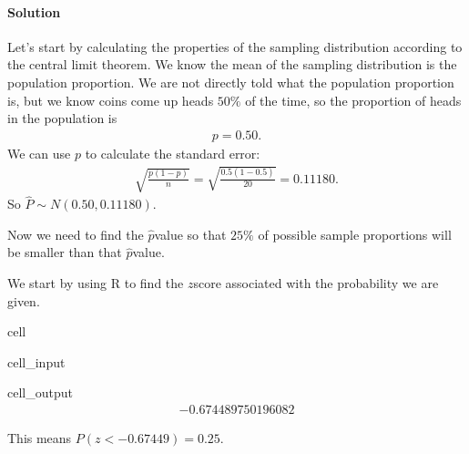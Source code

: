 \documentclass[letterpaper,10pt,english]{jupyterBook}
\begin{document}
\paragraph{Solution}
\label{\detokenize{Ch4 The Normal Distribution and the Central Limit Theorem/4.5 The Central Limit Theorem for Proportions:id2}}
\sphinxAtStartPar
Let’s start by calculating the properties of the sampling distribution according to the central limit theorem. We know the mean of the sampling distribution is the population proportion. We are not directly told what the population proportion is, but we know coins come up heads \(50\%\) of the time, so the proportion of heads in the population is
\begin{equation*}
\begin{split} p = 0.50. \end{split}
\end{equation*}
\sphinxAtStartPar
We can use \(p\) to calculate the standard error:
\begin{equation*}
\begin{split} \sqrt{\frac{p(1-p)}{n}} = \sqrt{\frac{0.5(1 - 0.5)}{20}} = 0.11180. \end{split}
\end{equation*}
\sphinxAtStartPar
So \(\hat{P} \sim N(0.50, 0.11180)\).

\sphinxAtStartPar
Now we need to find the \(\hat{p}\)\sphinxhyphen{}value so that \(25\%\) of possible sample proportions will be smaller than that \(\hat{p}\)\sphinxhyphen{}value.

\sphinxAtStartPar
We start by using R to find the \(z\)\sphinxhyphen{}score associated with the probability we are given.

\begin{sphinxuseclass}{cell}\begin{sphinxVerbatimInput}

\begin{sphinxuseclass}{cell_input}
\begin{sphinxVerbatim}[commandchars=\\\{\}]
\end{sphinxVerbatim}

\end{sphinxuseclass}\end{sphinxVerbatimInput}
\begin{sphinxVerbatimOutput}

\begin{sphinxuseclass}{cell_output}\begin{equation*}
\begin{split}-0.674489750196082\end{split}
\end{equation*}
\end{sphinxuseclass}\end{sphinxVerbatimOutput}

\end{sphinxuseclass}
\sphinxAtStartPar
This means \(P(z < -0.67449) = 0.25\).
\end{document}
